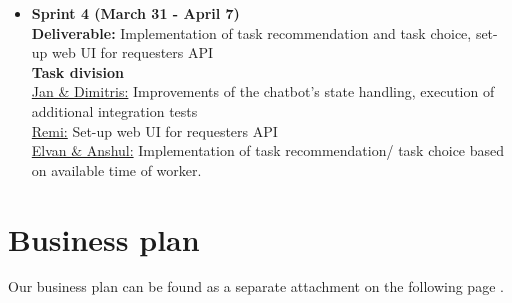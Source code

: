 \documentclass[a4paper,dutch,fleqn]{exam}
\begin{document}
\begin{itemize}
\item \textbf{Sprint 4 (March 31 - April 7)} \\
\textbf{Deliverable:} Implementation of task recommendation and task choice, set-up web UI for requesters API \\
\textbf{Task division} \\
\underline{Jan \& Dimitris:} Improvements of the chatbot's state handling, execution of additional integration tests \\
\underline{Remi:} Set-up web UI for requesters API \\
\underline{Elvan \& Anshul:} Implementation of task recommendation/ task choice based on available time of worker.
\end{itemize}

\section{Business plan}
Our business plan can be found as a separate attachment on the following page \cite{osterwalder2010business}.



\newpage 

\printbibliography
\end{document}
